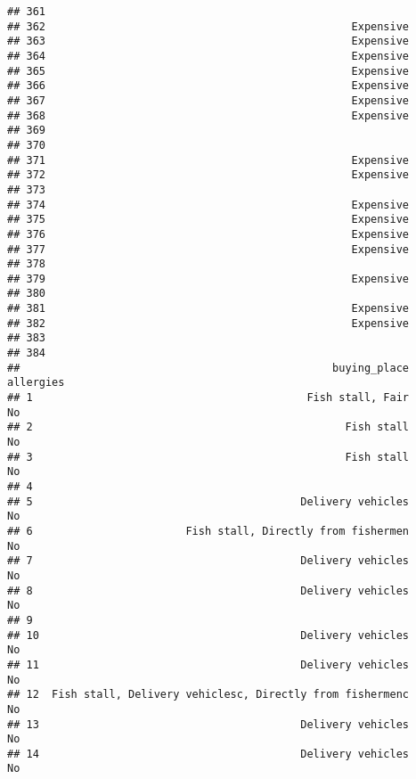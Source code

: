 \documentclass[
]{article}
\begin{document}
\begin{verbatim}
## 361                                                         
## 362                                                Expensive
## 363                                                Expensive
## 364                                                Expensive
## 365                                                Expensive
## 366                                                Expensive
## 367                                                Expensive
## 368                                                Expensive
## 369                                                         
## 370                                                         
## 371                                                Expensive
## 372                                                Expensive
## 373                                                         
## 374                                                Expensive
## 375                                                Expensive
## 376                                                Expensive
## 377                                                Expensive
## 378                                                         
## 379                                                Expensive
## 380                                                         
## 381                                                Expensive
## 382                                                Expensive
## 383                                                         
## 384                                                         
##                                                 buying_place allergies
## 1                                           Fish stall, Fair        No
## 2                                                 Fish stall        No
## 3                                                 Fish stall        No
## 4                                                                     
## 5                                          Delivery vehicles        No
## 6                        Fish stall, Directly from fishermen        No
## 7                                          Delivery vehicles        No
## 8                                          Delivery vehicles        No
## 9                                                                     
## 10                                         Delivery vehicles        No
## 11                                         Delivery vehicles        No
## 12  Fish stall, Delivery vehiclesc, Directly from fishermenc        No
## 13                                         Delivery vehicles        No
## 14                                         Delivery vehicles        No

\end{verbatim}
\end{document}
